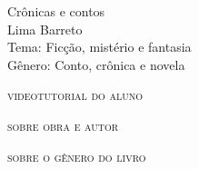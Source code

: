 \documentclass[smaller,professionalfonts,15pt]{beamer}
\begin{document}
										\begin{frame}\begin{raggedleft}
										\Huge 
Crônicas e contos						\\
										\huge 
Lima Barreto							\\
										\bigskip
										\normalsize
Tema: Ficção, mistério e fantasia		\\	
Gênero: Conto, crônica e novela			\\\vfill\hfill
\publishername
										\end{raggedleft}

\end{frame}


\begin{frame}{\textsc{videotutorial do aluno}}
\vspace{-2cm}\begin{figure}
\end{figure}
\end{frame}



\begin{frame}
\hfill\Huge
\textsc{sobre obra e autor}
\end{frame}

\begin{frame}
\hfill\Huge
\textsc{sobre o gênero do livro}
\end{frame}
\end{document}
